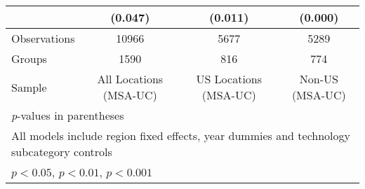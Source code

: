 {\begin{longtable}{l*{3}{c}}
                &  (0.047)         &  (0.011)         &  (0.000)         \\
\hline
Observations    &    10966         &     5677         &     5289         \\
Groups          &     1590         &      816         &      774         \\
Sample          &All Locations (MSA-UC)         &US Locations (MSA-UC)         &Non-US (MSA-UC)         \\
\hline\hline
\multicolumn{4}{l}{\footnotesize \textit{p}-values in parentheses}\\
\multicolumn{4}{l}{\footnotesize All models include region fixed effects, year dummies and technology subcategory controls}\\
\multicolumn{4}{l}{\footnotesize \sym{*} \(p<0.05\), \sym{**} \(p<0.01\), \sym{***} \(p<0.001\)}\\
\end{longtable}
}
